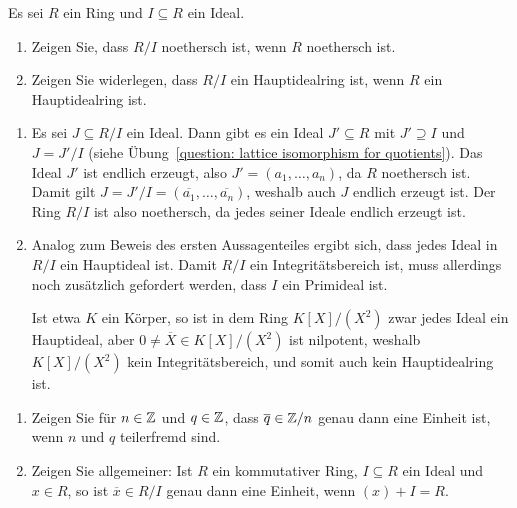 \begin{question}[subtitle = Noethersch und Hauptidealring für Quotienten]
  Es sei $R$ ein Ring und $I \subseteq R$ ein Ideal.
  \begin{enumerate}
    \item
      Zeigen Sie, dass $R/I$ noethersch ist, wenn $R$ noethersch ist.
    \item
      Zeigen Sie widerlegen, dass $R/I$ ein Hauptidealring ist, wenn $R$ ein Hauptidealring ist.
  \end{enumerate}
\end{question}


\begin{solution}
  \begin{enumerate}
    \item
      Es sei $J \subseteq R/I$ ein Ideal.
      Dann gibt es ein Ideal $J' \subseteq R$ mit $J' \supseteq I$ und $J = J'/I$ (siehe Übung~\ref{question: lattice isomorphism for quotients}).
      Das Ideal $J'$ ist endlich erzeugt, also $J' = (a_1, \dotsc, a_n)$, da $R$ noethersch ist.
      Damit gilt $J = J'/I = (\overline{a_1}, \dotsc, \overline{a_n})$, weshalb auch $J$ endlich erzeugt ist.
      Der Ring $R/I$ ist also noethersch, da jedes seiner Ideale endlich erzeugt ist.
    \item
      Analog zum Beweis des ersten Aussagenteiles ergibt sich, dass jedes Ideal in $R/I$ ein Hauptideal ist.
      Damit $R/I$ ein Integritätsbereich ist, muss allerdings noch zusätzlich gefordert werden, dass $I$ ein Primideal ist.
      
      Ist etwa $K$ ein Körper, so ist in dem Ring $K[X]/(X^2)$ zwar jedes Ideal ein Hauptideal, aber $0 \neq \overline{X} \in K[X]/(X^2)$ ist nilpotent, weshalb $K[X]/(X^2)$ kein Integritätsbereich, und somit auch kein Hauptidealring ist.
  \end{enumerate}
\end{solution}


\begin{question}[subtitle = Einheiten in Quotienten]
  \label{question: unit group of quotients}
  \begin{enumerate}
    \item
      Zeigen Sie für $n \in \mathbb{Z}$ und $q \in \mathbb{Z}$, dass $\overline{q} \in \mathbb{Z}/n$ genau dann eine Einheit ist, wenn $n$ und $q$ teilerfremd sind.
    \item
      Zeigen Sie allgemeiner:
      Ist $R$ ein kommutativer Ring, $I \subseteq R$ ein Ideal und $x \in R$, so ist $\overline{x} \in R/I$ genau dann eine Einheit, wenn $(x) + I = R$.
  \end{enumerate}
\end{question}


